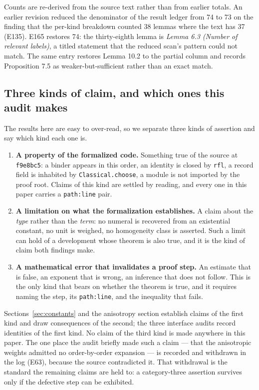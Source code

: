 \documentclass[11pt]{article}
\newcommand{\file}[1]{\texttt{\small #1}}
\theoremstyle{plain}
\theoremstyle{definition}
\theoremstyle{remark}
\begin{document}
Counts are re-derived from the source text rather than from earlier totals. An
earlier revision reduced the denominator of the result ledger from 74 to 73 on
the finding that the per-kind breakdown counted 38 lemmas where the text has 37
(E135). E165 restores 74: the thirty-eighth lemma is \emph{Lemma 6.3 (Number of
relevant labels)}, a titled statement that the reduced scan's pattern could not
match. The same entry restores Lemma 10.2 to the partial column and records
Proposition 7.5 as weaker-but-sufficient rather than an exact match.

\subsection{Three kinds of claim, and which ones this audit makes}
\label{sec:categories}

The results here are easy to over-read, so we separate three kinds of assertion
and say which kind each one is.

\begin{enumerate}
\item \textbf{A property of the formalized code.} Something true of the source at
\texttt{f9e8bc5}: a binder appears in this order, an identity is closed by
\texttt{rfl}, a record field is inhabited by \texttt{Classical.choose}, a module
is not imported by the proof root. Claims of this kind are settled by reading,
and every one in this paper carries a \file{path:line} pair.

\item \textbf{A limitation on what the formalization establishes.} A claim about
the \emph{type} rather than the \emph{term}: no numeral is recovered from an
existential constant, no unit is weighed, no homogeneity class is asserted. Such
a limit can hold of a development whose theorem is also true, and it is the kind
of claim both findings make.

\item \textbf{A mathematical error that invalidates a proof step.} An estimate
that is false, an exponent that is wrong, an inference that does not follow. This
is the only kind that bears on whether the theorem is true, and it requires
naming the step, its \file{path:line}, and the inequality that fails.
\end{enumerate}

Sections~\ref{sec:constants} and the anisotropy section establish claims of the
first kind and draw consequences of the second; the three interface audits record
identities of the first kind. No claim of the third kind is made anywhere in this
paper. The one place the audit briefly made such a claim --- that the anisotropic
weights admitted no order-by-order expansion --- is recorded and withdrawn in the
log (E63), because the source contradicted it. That withdrawal is the standard
the remaining claims are held to: a category-three assertion survives only if the
defective step can be exhibited.
\end{document}

